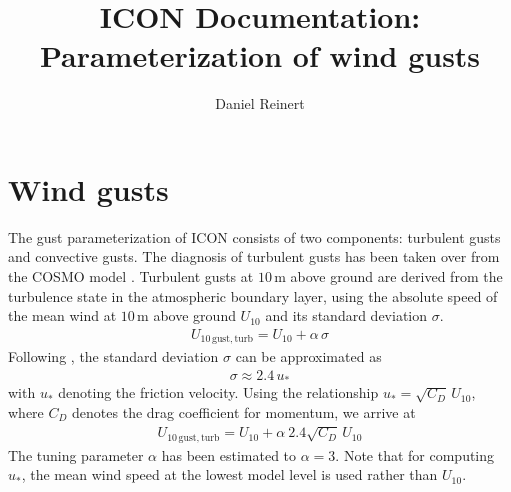 \documentclass[a4paper,11pt]{article}
\author{Daniel Reinert}
\title{ICON Documentation: Parameterization of wind gusts}
\begin{document}
  \maketitle



\section{Wind gusts}

The gust parameterization of ICON consists of two components: turbulent gusts and convective gusts. The diagnosis of turbulent gusts has been taken over from the COSMO 
model \citep{Schulz:2003,Schulz:2008}. Turbulent gusts at $10\,\mathrm{m}$ above ground are derived from the turbulence state in the atmospheric boundary layer, using the absolute speed 
of the mean wind at $10\,\mathrm{m}$ above ground $U_{10}$ and its standard deviation $\sigma$.
\begin{align}
 U_{10\,\mathrm{gust, turb}} = U_{10} + \alpha\, \sigma
\end{align}
Following \cite{Panofsky:1984}, the standard deviation $\sigma$ can be approximated as
\begin{align*}
 \sigma \approx 2.4\,u_{\ast}
\end{align*}
with $u_{\ast}$ denoting the friction velocity. Using the relationship $u_{\ast}=\sqrt{C_{D}}\,U_{10}$, where $C_{D}$ denotes the drag coefficient for momentum, we 
arrive at
\begin{align}
 U_{10\,\mathrm{gust, turb}} = U_{10} + \alpha\ 2.4 \sqrt{C_{D}}\,U_{10} \label{eq_turb_gust}
\end{align}
The tuning parameter $\alpha$ has been estimated to $\alpha=3$. Note that for computing $u_{\ast}$, the mean wind speed at the lowest model level is used rather 
than $U_{10}$.
\end{document}
